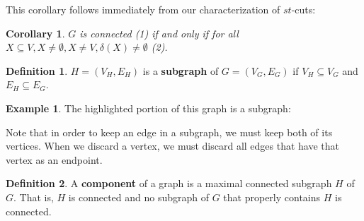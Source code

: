 \documentclass[]{article}
\newtheorem*{corollary}{Corollary}
\theoremstyle{definition}
\newtheorem*{defn}{Definition}
\newtheorem{ex}{Example}[section]
\begin{document}
				This corollary follows immediately from our characterization of $st$-cuts:
				\begin{corollary}
					$G$ is connected (1) if and only if for all $X \subseteq V, X \ne \emptyset, X \ne V, \delta(X) \ne \emptyset$ (2).
				\end{corollary}

				\begin{defn}
					$H = (V_H, E_H)$ is a \textbf{subgraph} of $G = (V_G, E_G)$ if $V_H \subseteq V_G$ and $E_H \subseteq E_G$.
				\end{defn}

				\begin{ex}
					The highlighted portion of this graph is a subgraph:
					\begin{center}
					\end{center}
				\end{ex}

				Note that in order to keep an edge in a subgraph, we must keep both of its vertices. When we discard a vertex, we must discard all edges that have that vertex as an endpoint.

				\begin{defn}
					A \textbf{component} of a graph is a maximal connected subgraph $H$ of $G$. That is, $H$ is connected and no subgraph of $G$ that properly contains $H$ is connected.
				\end{defn}
\end{document}
